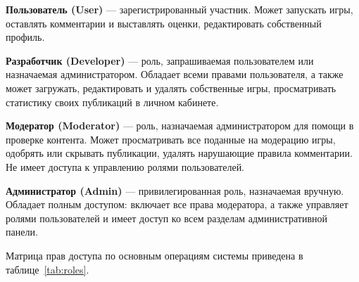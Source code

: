 \textbf{Пользователь (User)} --- зарегистрированный участник. Может запускать
игры, оставлять комментарии и выставлять оценки, редактировать собственный профиль.

\textbf{Разработчик (Developer)} --- роль, запрашиваемая пользователем или
назначаемая администратором. Обладает всеми правами пользователя, а также
может загружать, редактировать и удалять собственные игры, просматривать
статистику своих публикаций в личном кабинете.

\textbf{Модератор (Moderator)} --- роль, назначаемая администратором для помощи
в проверке контента. Может просматривать все поданные на модерацию игры, одобрять
или скрывать публикации, удалять нарушающие правила комментарии. Не имеет доступа
к управлению ролями пользователей.

\textbf{Администратор (Admin)} --- привилегированная роль, назначаемая вручную.
Обладает полным доступом: включает все права модератора, а также управляет ролями
пользователей и имеет доступ ко всем разделам административной панели.

Матрица прав доступа по основным операциям системы приведена в
таблице~\ref{tab:roles}.

